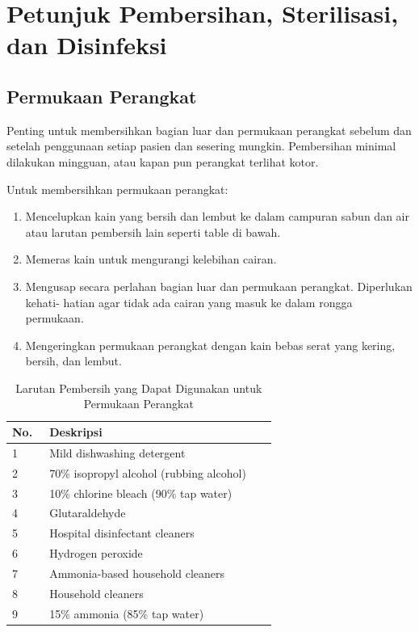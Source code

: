 \documentclass[11pt,a4paper,twoside,draft,onecolumn]{book}
\begin{document}
	\newpage
	
	\chapter{Petunjuk Pembersihan, Sterilisasi, dan Disinfeksi}
		\section{Permukaan Perangkat}
		Penting untuk membersihkan bagian luar dan permukaan perangkat sebelum dan setelah penggunaan setiap pasien dan sesering mungkin. Pembersihan minimal dilakukan mingguan, atau kapan pun perangkat terlihat kotor.
		
		Untuk membersihkan permukaan perangkat:
		\begin{enumerate}
			\item Mencelupkan kain yang bersih dan lembut ke dalam campuran sabun dan air atau larutan pembersih lain seperti table di bawah.
			\item Memeras kain untuk mengurangi kelebihan cairan.
			\item Mengusap secara perlahan bagian luar dan permukaan perangkat. Diperlukan kehati- hatian agar tidak ada cairan yang masuk ke dalam rongga permukaan.
			\item Mengeringkan permukaan perangkat dengan kain bebas serat yang kering, bersih, dan lembut.
		\end{enumerate}
		
		\begin{table}
			\centering
			\caption{Larutan Pembersih yang Dapat Digunakan untuk Permukaan Perangkat}
			\label{tab:7.1}
			\begin{tabular}{|p{0.05\linewidth}  | p{0.6\linewidth}|}
				\hline
				No. & Deskripsi \\
				\hline
				\hline
				1 & Mild dishwashing detergent\\
				\hline
				2 & 70\% isopropyl alcohol (rubbing alcohol)\\
				\hline
				3 & 10\% chlorine bleach (90\% tap water)\\
				\hline
				4 & Glutaraldehyde\\
				\hline
				5 & Hospital disinfectant cleaners\\
				\hline
				6 & Hydrogen peroxide\\
				\hline
				7 & Ammonia-based household cleaners\\
				\hline
				8 & Household cleaners\\
				\hline
				9 & 15\% ammonia (85\% tap water)\\
				\hline
			\end{tabular}
		\end{table}
		
\end{document}
